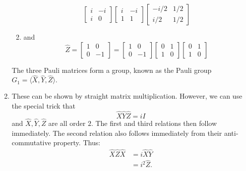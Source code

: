 \documentclass{article}
\numberwithin{equation}{section}
\begin{document}
\begin{enumerate}
\begin{enumerate}
\begin{equation}
\begin{bmatrix}
                i & -i \\ 
                i & 0
            \end{bmatrix} \begin{bmatrix}
                i & -i \\ 
                1 & 1
            \end{bmatrix} \begin{bmatrix}
                -i/2 & 1/2 \\ 
                i/2 & 1/2
            \end{bmatrix}
        \end{equation}
        \item and 
        \begin{equation}
            \hat{Z} = \begin{bmatrix}
                1 & 0 \\ 
                0 & -1
                \end{bmatrix} = \begin{bmatrix}
                    1 & 0 \\
                    0 & -1
                \end{bmatrix}\begin{bmatrix}
                    0 & 1 \\ 
                    1 & 0
                \end{bmatrix}\begin{bmatrix}
                    0 & 1 \\ 
                    1 & 0
                \end{bmatrix}
        \end{equation}
    \end{enumerate}
     The three Pauli matrices form a group, known as the Pauli group $G_1 = \langle \hat{X},\hat{Y},\hat{Z} \rangle.$
    \item These can be shown by straight matrix multiplication. However, we can use the special trick that
    \begin{equation}
        \hat{X}\hat{Y}\hat{Z} = iI
    \end{equation}
    and $\hat{X},\hat{Y},\hat{Z}$ are all order $2$.  The first and third relations then follow immediately. The second relation also follows immediately from their anti-commutative property. Thus:
    \begin{align}
        \hat{X}\hat{Z}\hat{X} &= i\hat{X}\hat{Y} \\ 
        &= i^2\hat{Z}.

\end{align}
\end{enumerate}
\end{document}

